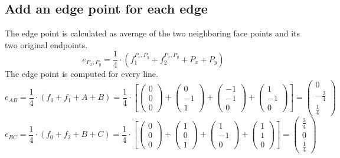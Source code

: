 \documentclass{article}
\begin{document}
\subsection{Add an edge point for each edge}
The edge point is calculated as average of the two neighboring face points and its two original endpoints.
\[e_{P_x,P_y}=\frac{1}{4}\cdot(f^{P_x,P_y}_1 + f^{P_x,P_y}_2 + P_x + P_y)\]
The edge point is computed for every line.
\[e_{AB}=\frac{1}{4}\cdot(f_0+f_1+A+B)=\frac{1}{4}\cdot\left[
\left({\begin{array}{c} 0 \\  0 \\ 0 \end{array}}\right)+
\left({\begin{array}{c} 0 \\ -1 \\ 1 \end{array}}\right)+
\left({\begin{array}{c} -1 \\ -1 \\ 0 \end{array}}\right)+
\left({\begin{array}{c} 1 \\  -1 \\ 0 \end{array}}\right)\right]=
\left({\begin{array}{c} 0 \\ -\frac{3}{4} \\ \frac{1}{4} \end{array}}\right)
\]
\[e_{BC}=\frac{1}{4}\cdot(f_0+f_2+B+C)=\frac{1}{4}\cdot\left[
\left({\begin{array}{c} 0 \\  0 \\ 0 \end{array}}\right)+
\left({\begin{array}{c} 1 \\ 0 \\ 1 \end{array}}\right)+
\left({\begin{array}{c} 1 \\ -1 \\ 0 \end{array}}\right)+
\left({\begin{array}{c} 1 \\  1 \\ 0 \end{array}}\right)\right]=
\left({\begin{array}{c} \frac{3}{4} \\ 0 \\ \frac{1}{4} \end{array}}\right)
\]
\end{document}
